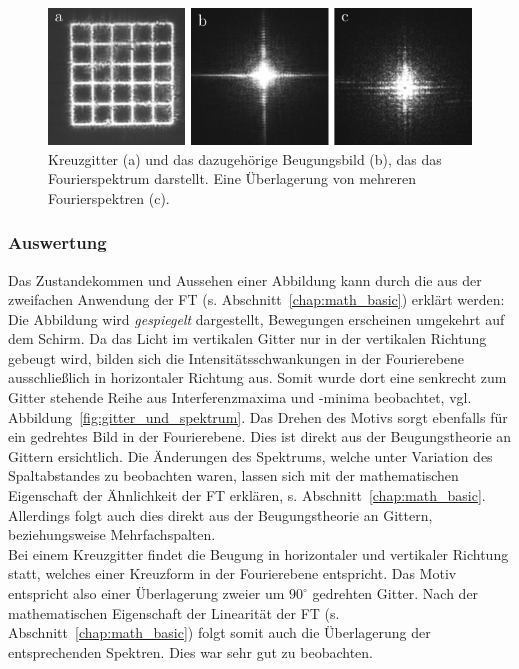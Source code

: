 \begin{figure}[ht]
	\centering
	\includegraphics{images/Regina/abb14.pdf}
	\caption[Kreuzgitter mit Fourierspektrum]{
		Kreuzgitter (a) und das dazugehörige Beugungsbild (b), das das Fourierspektrum darstellt. Eine Überlagerung von mehreren Fourierspektren (c).
	}
	\label{fig:kreuzgitter_und_spektrum}
\end{figure}



\subsubsection*{Auswertung}
Das Zustandekommen und Aussehen einer Abbildung kann durch die aus der zweifachen Anwendung der FT (s. Abschnitt~\ref{chap:math_basic}) erklärt werden: Die Abbildung wird \textit{gespiegelt} dargestellt, Bewegungen erscheinen umgekehrt auf dem Schirm. Da das Licht im vertikalen Gitter nur in der vertikalen Richtung gebeugt wird, bilden sich die Intensitätsschwankungen in der Fourierebene ausschließlich in horizontaler Richtung aus. Somit wurde dort eine senkrecht zum Gitter stehende Reihe aus Interferenzmaxima und -minima beobachtet, vgl. Abbildung~\ref{fig:gitter_und_spektrum}. Das Drehen des Motivs sorgt ebenfalls für ein gedrehtes Bild in der Fourierebene. Dies ist direkt aus der Beugungstheorie an Gittern ersichtlich. Die Änderungen des Spektrums, welche unter Variation des Spaltabstandes zu beobachten waren, lassen sich mit der mathematischen Eigenschaft der Ähnlichkeit der FT erklären, s. Abschnitt~\ref{chap:math_basic}. Allerdings folgt auch dies direkt aus der Beugungstheorie an Gittern, beziehungsweise Mehrfachspalten.\\

Bei einem Kreuzgitter findet die Beugung in horizontaler und vertikaler Richtung statt, welches einer Kreuzform in der Fourierebene entspricht. Das Motiv entspricht also einer Überlagerung zweier um $90^\circ$ gedrehten Gitter. Nach der mathematischen Eigenschaft der Linearität der FT (s. Abschnitt~\ref{chap:math_basic}) folgt somit auch die Überlagerung der entsprechenden Spektren. Dies war sehr gut zu beobachten.

